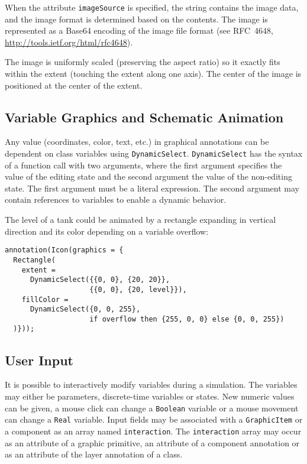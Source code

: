 When the attribute \lstinline!imageSource! is specified, the string contains the
image data, and the image format is determined based on the contents.
The image is represented as a Base64 encoding of the image file format
(see RFC~4648, \url{http://tools.ietf.org/html/rfc4648}).

The image is uniformly scaled (preserving the aspect ratio) so it exactly fits within the extent (touching the
extent along one axis).  The center of the image is positioned at the center of the extent.

\subsection{Variable Graphics and Schematic Animation}\label{variable-graphics-and-schematic-animation}

Any value (coordinates, color, text, etc.) in graphical annotations can be dependent on class variables using \lstinline!DynamicSelect!.
\lstinline!DynamicSelect! has the syntax of a function call with two arguments, where the first argument specifies the value of the editing state and the second argument the value of the non-editing state.
The first argument must be a literal expression.
The second argument may contain references to variables to enable a dynamic behavior.

\begin{example}
The level of a tank could be animated by a rectangle expanding in vertical direction and its color depending on a variable overflow:
\begin{lstlisting}[language=modelica]
annotation(Icon(graphics = {
  Rectangle(
    extent =
      DynamicSelect({{0, 0}, {20, 20}},
                    {{0, 0}, {20, level}}),
    fillColor =
      DynamicSelect({0, 0, 255},
                    if overflow then {255, 0, 0} else {0, 0, 255})
  )}));
\end{lstlisting}
\end{example}

\subsection{User Input}\label{user-input}

It is possible to interactively modify variables during a simulation.  The variables may either be parameters, discrete-time variables or states.  New numeric values can be given, a mouse click can change a \lstinline!Boolean! variable or a mouse movement can change a \lstinline!Real! variable.  Input fields may be associated with a \lstinline!GraphicItem! or a component as an array named \lstinline!interaction!.  The \lstinline!interaction! array may occur as an attribute of a graphic primitive, an attribute of a component annotation or as an attribute of the layer annotation of a class.

